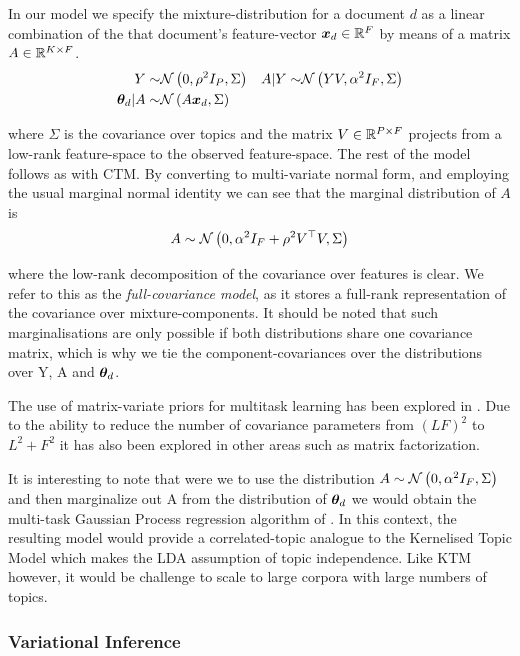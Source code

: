 In our model we specify the mixture-distribution for a document $d$ as a linear combination of the that document's feature-vector ${ \bm x_d } \in { \mathbb{R}^{F} }$ by means of a matrix $A \in { \mathbb{R}^{K \times F} }$.
\begin{align}
Y \sim & \mathcal{N} \left(0, \rho^2 I_P, \Sigma\right) & A|Y \sim & \mathcal{N} \left(YV, \alpha^2 I_F, \Sigma\right) \\
{ \bm \theta_d } | A \sim & \mathcal{N} \left( {A\bm x_d}, {\Sigma} \right)
\end{align}

where $\Sigma$ is the covariance over topics and the matrix $V \in { \mathbb{R}^{P \times F} }$ projects from a low-rank feature-space to the observed feature-space. The rest of the model follows as with CTM. By converting to multi-variate normal form, and employing the usual marginal normal identity\cite{Bishop2006}  we can see that the marginal distribution of $A$ is
\begin{equation}
A \sim \mathcal{N} \left(0, \alpha^2 I_F + \rho^2 V^\top V, \Sigma\right)
\end{equation}

where the low-rank decomposition of the covariance over features is clear. We refer to this as the \emph{full-covariance model}, as it stores a full-rank representation of the covariance over mixture-components. It should be noted that such marginalisations are only possible if both distributions share one covariance matrix, which is why we tie the component-covariances over the distributions over Y, A and ${ \bm \theta_d }$. 

The use of matrix-variate priors for multitask learning has been explored in \cite{Stegle2011}\cite{Bonilla2008} \cite{Archambeau2011}\cite{Yang2011}. Due to the ability to reduce the number of covariance parameters from $(LF)^2$ to $L^2 + F^2$ it has also been explored in other areas such as matrix factorization\cite{Allen2010}.

It is interesting to note that were we to use the distribution $A \sim \mathcal{N} \left(0, \alpha^2 I_F, \Sigma\right)$ and then marginalize out A from the distribution of ${ \bm \theta_d }$ we would obtain the multi-task Gaussian Process regression algorithm of \cite{Bonilla2008}. In this context, the resulting model would provide a correlated-topic analogue to the Kernelised Topic Model \cite{Hennig2012} which makes the LDA assumption of topic independence. Like KTM however, it would be challenge to scale to large corpora with large numbers of topics.

\subsubsection{Variational Inference}
\newcommand \onek { \one_K }
\newcommand \md { \vv{m}_d }
\newcommand \Vd { V^{(d)} }


